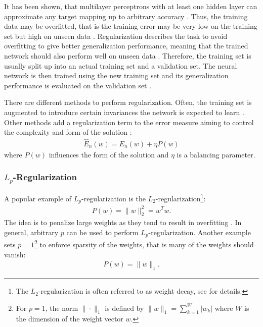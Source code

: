 
It has been shown, that multilayer perceptrons with at least one hidden layer can approximate any target mapping up to arbitrary accuracy \cite{HornikStinchcombeWhite:1989}. Thus, the training data may be overfitted, that is the training error may be very low on the training set but high on unseen data \cite{Bengio:2009}. Regularization describes the task to avoid overfitting to give better generalization performance, meaning that the trained network should also perform well on unseen data  \cite{Haykin:2005}. Therefore, the training set is usually split up into an actual training set and a validation set. The neural network is then trained using the new training set and its generalization performance is evaluated on the validation set \cite{DudaHartStork:2001}.

There are different methods to perform regularization. Often, the training set is augmented to introduce certain invariances the network is expected to learn \cite{KrizhevskySutskeverHinton:2012}. Other methods add a regularization term to the error measure aiming to control the complexity and form of the solution \cite{Bishop:1995}:
\begin{align}
	\hat{E}_n (w) = E_n (w) + \eta P(w)
\end{align}
where $P(w)$ influences the form of the solution and $\eta$ is a balancing parameter.

\subsubsection{$L_p$-Regularization}
\label{subsubsec:lp-regularization}

A popular example of $L_p$-regularization is the $L_2$-regularization\footnote{The $L_2$-regularization is often referred to as weight decay, see \cite{Bishop:1995} for details.}:
\begin{align}
	P(w) = \|w\|_2^2 = w^Tw.
\end{align}
The idea is to penalize large weights as they tend to result in overfitting \cite{Bishop:1995}. In general, arbitrary $p$ can be used to perform $L_p$-regularization. Another example sets $p = 1$\footnote{For $p = 1$, the norm $\|\cdot\|_1$ is defined by $\|w\|_1 = \sum_{k = 1} ^W |w_k|$ where $W$ is the dimension of the weight vector $w$.} to enforce sparsity of the weights, that is many of the weights should vanish:
\begin{align}
	P(w) = \|w\|_1.
\end{align}

